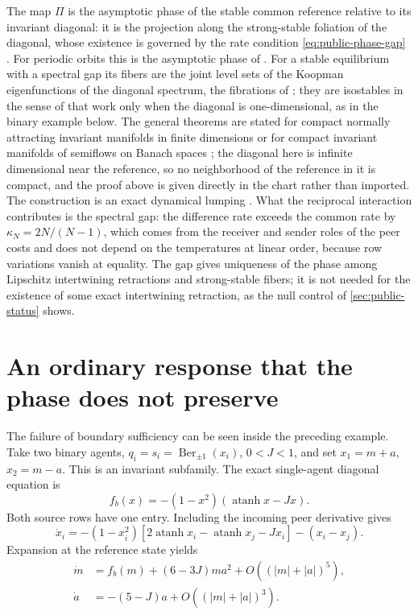 The map $\Pi$ is the asymptotic phase of the stable common reference relative to its invariant diagonal: it is the projection along the strong-stable foliation of the diagonal, whose existence is governed by the rate condition \cref{eq:public-phase-gap} \citep{Fenichel1974}. For periodic orbits this is the asymptotic phase of \citet{Guckenheimer1975}. For a stable equilibrium with a spectral gap its fibers are the joint level sets of the Koopman eigenfunctions of the diagonal spectrum, the fibrations of \citet{MauroyMezicMoehlis2013}; they are isostables in the sense of that work only when the diagonal is one-dimensional, as in the binary example below. The general theorems are stated for compact normally attracting invariant manifolds in finite dimensions \citep{ElderingKvalheimRevzen2018} or for compact invariant manifolds of semiflows on Banach spaces \citep{BatesLuZeng2000}; the diagonal here is infinite dimensional near the reference, so no neighborhood of the reference in it is compact, and the proof above is given directly in the chart rather than imported. The construction is an exact dynamical lumping \citep{HorstmeyerAtay2016}. What the reciprocal interaction contributes is the spectral gap: the difference rate exceeds the common rate by $\kappa_N=2N/(N-1)$, which comes from the receiver and sender roles of the peer costs and does not depend on the temperatures at linear order, because row variations vanish at equality. The gap gives uniqueness of the phase among Lipschitz intertwining retractions and strong-stable fibers; it is not needed for the existence of some exact intertwining retraction, as the null control of \cref{sec:public-status} shows.

\section{An ordinary response that the phase does not preserve}
\label{sec:public-phase-response}

The failure of boundary sufficiency can be seen inside the preceding example. Take two binary agents, $q_i=s_i=\operatorname{Ber}_{\pm1}(x_i)$, $0<J<1$, and set $x_1=m+a$, $x_2=m-a$. This is an invariant subfamily. The exact single-agent diagonal equation is
\begin{equation}
 f_b(x)=-(1-x^2)(\operatorname{atanh}x-Jx).
 \label{eq:public-phase-binary}
\end{equation}
Both source rows have one entry. Including the incoming peer derivative gives
\begin{equation}
 \dot x_i=-(1-x_i^2)
 [2\operatorname{atanh}x_i-\operatorname{atanh}x_j-Jx_i]
 -(x_i-x_j).
 \label{eq:public-phase-binary-fine}
\end{equation}
Expansion at the reference state yields
\begin{equation}
 \begin{aligned}
 \dot m&=f_b(m)+(6-3J)ma^2+O((|m|+|a|)^5),\\
 \dot a&=-(5-J)a+O((|m|+|a|)^3).
 \end{aligned}
 \label{eq:public-phase-binary-expansion}
\end{equation}

